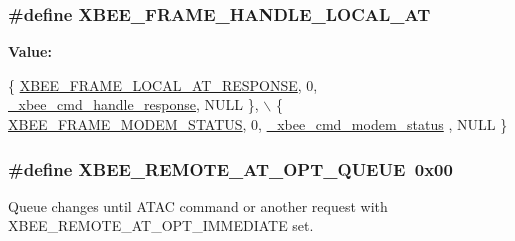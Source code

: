 \hypertarget{group__xbee__atcmd_gaae50224419f278ac13faf6637befa899}{
\subsubsection[{X\-B\-E\-E\-\_\-\-F\-R\-A\-M\-E\-\_\-\-H\-A\-N\-D\-L\-E\-\_\-\-L\-O\-C\-A\-L\-\_\-\-A\-T}]{\setlength{\rightskip}{0pt plus 5cm}\#define X\-B\-E\-E\-\_\-\-F\-R\-A\-M\-E\-\_\-\-H\-A\-N\-D\-L\-E\-\_\-\-L\-O\-C\-A\-L\-\_\-\-A\-T}}\label{group__xbee__atcmd_gaae50224419f278ac13faf6637befa899}
{\bfseries Value\-:}
\begin{DoxyCode}
\{ \hyperlink{group__xbee__device_gga7753bbebaf00d6d64942f64b6ae9b7b9ae66771334070219cd098c8201936cf4a}{XBEE\_FRAME\_LOCAL\_AT\_RESPONSE}, 0, 
      \hyperlink{group__xbee__atcmd_ga3b4559f4e729b1c96f5c0d9e4476aa7d}{\_xbee\_cmd\_handle\_response}, NULL \}, \(\backslash\)
   \{ \hyperlink{group__xbee__device_gga7753bbebaf00d6d64942f64b6ae9b7b9adff71d45371cf6b933688c43994b7f81}{XBEE\_FRAME\_MODEM\_STATUS}, 0, \hyperlink{group__xbee__atcmd_ga9b0ddf7aae7599dc334304f2b642f05f}{\_xbee\_cmd\_modem\_status}
      , NULL \}
\end{DoxyCode}
\hypertarget{group__xbee__atcmd_ga3ca0a18e4e629050e8f1387f72638f69}{
\subsubsection[{X\-B\-E\-E\-\_\-\-R\-E\-M\-O\-T\-E\-\_\-\-A\-T\-\_\-\-O\-P\-T\-\_\-\-Q\-U\-E\-U\-E}]{\setlength{\rightskip}{0pt plus 5cm}\#define X\-B\-E\-E\-\_\-\-R\-E\-M\-O\-T\-E\-\_\-\-A\-T\-\_\-\-O\-P\-T\-\_\-\-Q\-U\-E\-U\-E~0x00}}\label{group__xbee__atcmd_ga3ca0a18e4e629050e8f1387f72638f69}


Queue changes until A\-T\-A\-C command or another request with X\-B\-E\-E\-\_\-\-R\-E\-M\-O\-T\-E\-\_\-\-A\-T\-\_\-\-O\-P\-T\-\_\-\-I\-M\-M\-E\-D\-I\-A\-T\-E set. 



